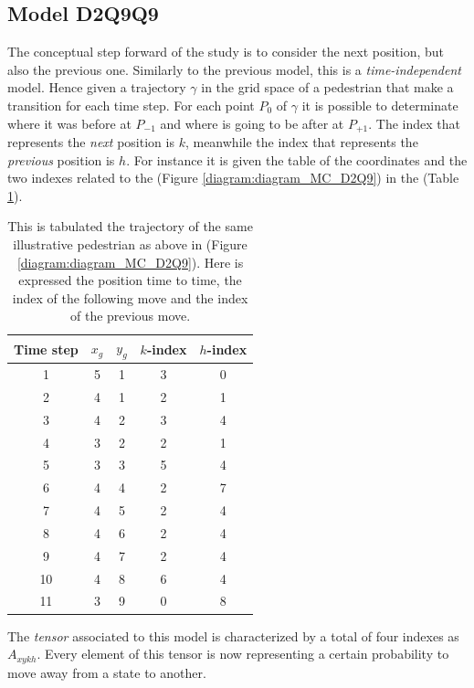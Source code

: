 \documentclass[class=article, crop=false]{standalone}
\begin{document}
\subsection{Model D2Q9Q9}
The conceptual step forward of the study is to consider the next position, but also the previous one.
Similarly to the previous model, this is a \emph{time-independent} model.
Hence given a trajectory $\gamma$ in the grid space of a pedestrian that make a transition for each time step.
For each point $P_0$ of $\gamma$ it is possible to determinate where it was before at $P_{-1}$ and where is going to be after at $P_{+1}$.
The index that represents the \emph{next} position is $k$, meanwhile the index that represents the \emph{previous} position is $h$.
For instance it is given the table of the coordinates and the two indexes related to the (Figure \ref{diagram:diagram_MC_D2Q9}) in the (Table \ref{table:diagram_MC_D2Q9}).
\begin{table}[h!]
\centering
\begin{tabular}{|c|c|c|c|c|}
\hline
Time step & $x_g$ & $y_g$ & $k$-index & $h$-index  \\ \hline
1         & 5 & 1 & 3 & 0 \\ \hline
2         & 4 & 1 & 2 & 1 \\ \hline
3         & 4 & 2 & 3 & 4 \\ \hline
4         & 3 & 2 & 2 & 1 \\ \hline
5         & 3 & 3 & 5 & 4 \\ \hline
6         & 4 & 4 & 2 & 7 \\ \hline
7         & 4 & 5 & 2 & 4 \\ \hline
8         & 4 & 6 & 2 & 4 \\ \hline
9         & 4 & 7 & 2 & 4 \\ \hline
10        & 4 & 8 & 6 & 4 \\ \hline
11        & 3 & 9 & 0 & 8 \\ \hline
\end{tabular}
\captionsetup{width=.6\linewidth}
\caption{This is tabulated the trajectory of the same illustrative pedestrian as above in (Figure \ref{diagram:diagram_MC_D2Q9}).
Here is expressed the position time to time, the index of the following move and the index of the previous move.}
\label{table:diagram_MC_D2Q9}
\end{table}
The \emph{tensor} associated to this model is characterized by a total of four indexes as $A_{x y k h}$.
Every element of this tensor is now representing a certain probability to move away from a state to another.
\end{document}

